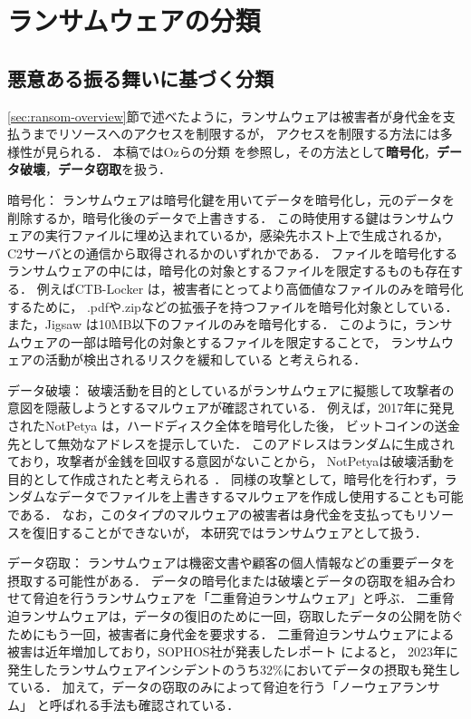 \section{ランサムウェアの分類}
\subsection{悪意ある振る舞いに基づく分類}
\ref{sec:ransom-overview}節で述べたように，ランサムウェアは被害者が身代金を支払うまでリソースへのアクセスを制限するが，
アクセスを制限する方法には多様性が見られる．
本稿ではOzらの分類 \cite{Evolution-Ransomware} を参照し，その方法として\textbf{暗号化}，\textbf{データ破壊}，\textbf{データ窃取}を扱う．

暗号化：
ランサムウェアは暗号化鍵を用いてデータを暗号化し，元のデータを削除するか，暗号化後のデータで上書きする．
この時使用する鍵はランサムウェアの実行ファイルに埋め込まれているか，感染先ホスト上で生成されるか，C2サーバとの通信から取得されるかのいずれかである．
ファイルを暗号化するランサムウェアの中には，暗号化の対象とするファイルを限定するものも存在する．
例えばCTB-Locker \cite{ctb-locker} は，被害者にとってより高価値なファイルのみを暗号化するために，
.pdfや.zipなどの拡張子を持つファイルを暗号化対象としている．
また，Jigsaw \cite{byrne2017jigsaw} は10MB以下のファイルのみを暗号化する．
このように，ランサムウェアの一部は暗号化の対象とするファイルを限定することで，
ランサムウェアの活動が検出されるリスクを緩和している \cite{huang2017flashguard}と考えられる．

データ破壊：
破壊活動を目的としているがランサムウェアに擬態して攻撃者の意図を隠蔽しようとするマルウェアが確認されている．
例えば，2017年に発見されたNotPetya \cite{Petya-No22:online} は，ハードディスク全体を暗号化した後，
ビットコインの送金先として無効なアドレスを提示していた．
このアドレスはランダムに生成されており，攻撃者が金銭を回収する意図がないことから，
NotPetyaは破壊活動を目的として作成されたと考えられる \cite{Petya-No22:online}．
同様の攻撃として，暗号化を行わず，ランダムなデータでファイルを上書きするマルウェアを作成し使用することも可能である．
なお，このタイプのマルウェアの被害者は身代金を支払ってもリソースを復旧することができないが，
本研究ではランサムウェアとして扱う．

データ窃取：
ランサムウェアは機密文書や顧客の個人情報などの重要データを摂取する可能性がある．
データの暗号化または破壊とデータの窃取を組み合わせて脅迫を行うランサムウェアを「二重脅迫ランサムウェア」と呼ぶ．
二重脅迫ランサムウェアは，データの復旧のために一回，窃取したデータの公開を防ぐためにもう一回，被害者に身代金を要求する．
二重脅迫ランサムウェアによる被害は近年増加しており，SOPHOS社が発表したレポート \cite{sophos-report:online} によると，
2023年に発生したランサムウェアインシデントのうち32\%においてデータの摂取も発生している．
加えて，データの窃取のみによって脅迫を行う「ノーウェアランサム」\cite{nowhere-ransom} と呼ばれる手法も確認されている．



